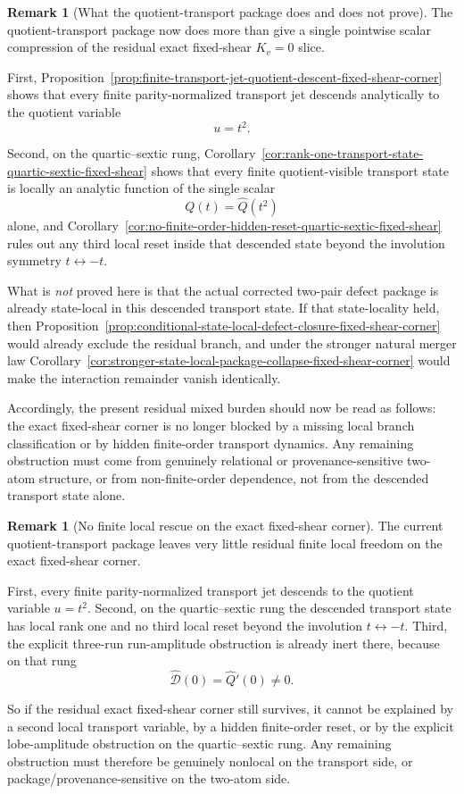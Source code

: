 \documentclass[11pt,a4paper]{amsart}
\theoremstyle{plain}
\theoremstyle{definition}
\newtheorem{remark}[theorem]{Remark}
\begin{document}
\begin{remark}[What the quotient-transport package does and does not prove]
\label{rem:what-quotient-transport-package-does-and-does-not-prove}
The quotient-transport package now does more than give a single pointwise
scalar compression of the residual exact fixed-shear $K_v=0$ slice.

First,
Proposition~\ref{prop:finite-transport-jet-quotient-descent-fixed-shear-corner}
shows that every finite parity-normalized transport jet descends analytically to
the quotient variable
\[
u=t^2.
\]

Second, on the quartic--sextic rung,
Corollary~\ref{cor:rank-one-transport-state-quartic-sextic-fixed-shear}
shows that every finite quotient-visible transport state is locally an analytic
function of the single scalar
\[
Q(t)=\widehat Q(t^2)
\]
alone, and
Corollary~\ref{cor:no-finite-order-hidden-reset-quartic-sextic-fixed-shear}
rules out any third local reset inside that descended state beyond the
involution symmetry $t\leftrightarrow -t$.

What is \emph{not} proved here is that the actual corrected two-pair defect
package is already state-local in this descended transport state. If that
state-locality held, then
Proposition~\ref{prop:conditional-state-local-defect-closure-fixed-shear-corner}
would already exclude the residual branch, and under the stronger natural merger
law
Corollary~\ref{cor:stronger-state-local-package-collapse-fixed-shear-corner}
would make the interaction remainder vanish identically.

Accordingly, the present residual mixed burden should now be read as follows:
the exact fixed-shear corner is no longer blocked by a missing local branch
classification or by hidden finite-order transport dynamics. Any remaining
obstruction must come from genuinely relational or provenance-sensitive two-atom
structure, or from non-finite-order dependence, not from the descended
transport state alone.
\end{remark}

\begin{remark}[No finite local rescue on the exact fixed-shear corner]
\label{rem:no-finite-local-rescue-exact-fixed-shear-corner}
The current quotient-transport package leaves very little residual finite local
freedom on the exact fixed-shear corner.

First, every finite parity-normalized transport jet descends to the quotient
variable $u=t^2$. Second, on the quartic--sextic rung the descended transport
state has local rank one and no third local reset beyond the involution
$t\leftrightarrow -t$. Third, the explicit three-run run-amplitude obstruction
is already inert there, because on that rung
\[
\widehat{\mathcal D}(0)=\widehat Q'(0)\neq 0.
\]

So if the residual exact fixed-shear corner still survives, it cannot be
explained by a second local transport variable, by a hidden finite-order reset,
or by the explicit lobe-amplitude obstruction on the quartic--sextic rung.
Any remaining obstruction must therefore be genuinely nonlocal on the transport
side, or package/provenance-sensitive on the two-atom side.
\end{remark}
\end{document}
